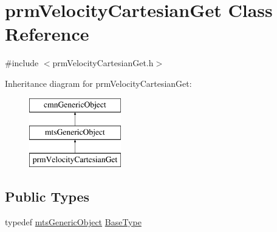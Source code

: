 \hypertarget{classprm_velocity_cartesian_get}{\section{prm\-Velocity\-Cartesian\-Get Class Reference}
\label{classprm_velocity_cartesian_get}
}


{\ttfamily \#include $<$prm\-Velocity\-Cartesian\-Get.\-h$>$}

Inheritance diagram for prm\-Velocity\-Cartesian\-Get\-:\begin{figure}[H]
\begin{center}
\leavevmode
\includegraphics[height=3.000000cm]{d5/db4/classprm_velocity_cartesian_get}
\end{center}
\end{figure}
\subsection*{Public Types}
\begin{DoxyCompactItemize}
\item 
typedef \hyperlink{classmts_generic_object}{mts\-Generic\-Object} \hyperlink{classprm_velocity_cartesian_get_a49e1fbc1e4ec5d09b4a9660564a1b547}{Base\-Type}
\end{DoxyCompactItemize}
